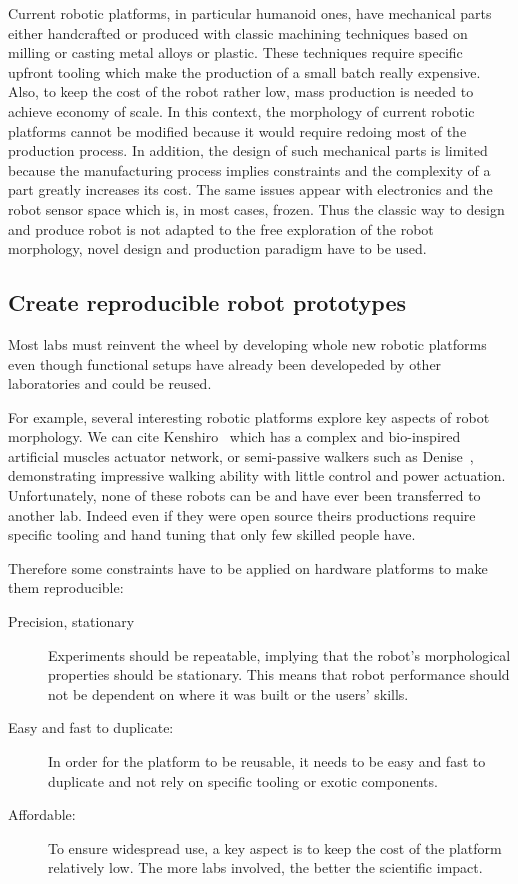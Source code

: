 Current robotic platforms, in particular humanoid ones, have mechanical parts either handcrafted or produced with classic machining techniques based on milling or casting metal alloys or plastic.
These techniques require specific upfront tooling which make the production of a small batch really expensive. Also, to keep the cost of the robot rather low, mass production is needed to achieve economy of scale. In this context, the morphology of current robotic platforms cannot be modified because it would require redoing most of the production process. In addition, the design of such mechanical parts is limited because the manufacturing process implies constraints and the complexity of a part greatly increases its cost. The same issues appear with electronics and the robot sensor space which is, in most cases, frozen. Thus the classic way to design and produce robot is not adapted to the free exploration of the robot morphology, novel design and production paradigm have to be used.


\subsection{Create reproducible robot prototypes} %

Most labs must reinvent the wheel by developing whole new robotic platforms even though functional setups have already been developeded by other laboratories and could be reused.

For example, several interesting robotic platforms explore key aspects of robot morphology. We can cite Kenshiro~\parencite{REF} which has a complex and bio-inspired artificial muscles actuator network, or semi-passive walkers such as Denise~\parencite{REF}, demonstrating impressive walking ability with little control and power actuation. Unfortunately, none of these robots can be and have ever been transferred to another lab. Indeed even if they were open source theirs productions require specific tooling and hand tuning that only few skilled people have.

Therefore some constraints have to be applied on hardware platforms to make them reproducible:
\begin{description}
    \item[Precision, stationary] Experiments should be repeatable, implying that the robot’s morphological properties should be stationary. This means that robot performance should not be dependent on where it was built or the users’ skills.
    \item[Easy and fast to duplicate:] In order for the platform to be reusable, it needs to be easy and fast to duplicate and not rely on specific tooling or exotic components.
    \item[Affordable:] To ensure widespread use, a key aspect is to keep the cost of the platform relatively low. The more labs involved, the better the scientific impact.
\end{description}


